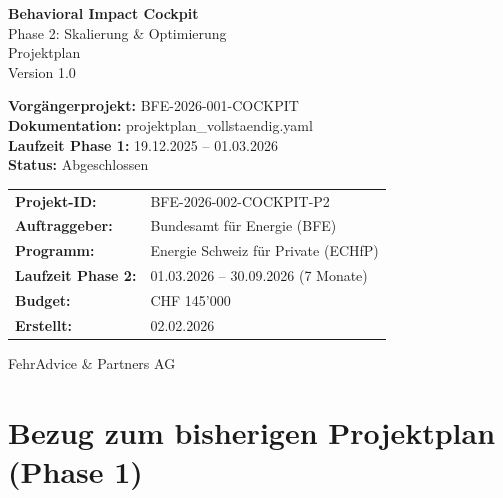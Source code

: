 \documentclass[11pt,a4paper]{article}
\begin{document}
\begin{titlepage}
    \centering
    \vspace*{2cm}

    {\Huge\bfseries\textcolor{fadarkblue}{Behavioral Impact Cockpit}}\\[0.5cm]
    {\LARGE\textcolor{fadarkblue}{Phase 2: Skalierung \& Optimierung}}\\[2cm]

    {\Large Projektplan}\\[0.5cm]
    {\large Version 1.0}\\[3cm]

    \begin{tcolorbox}[referenzbox={Bezug zu Phase 1}]
        \textbf{Vorgängerprojekt:} BFE-2026-001-COCKPIT\\
        \textbf{Dokumentation:} projektplan\_vollstaendig.yaml\\
        \textbf{Laufzeit Phase 1:} 19.12.2025 -- 01.03.2026\\
        \textbf{Status:} Abgeschlossen
    \end{tcolorbox}

    \vfill

    \begin{tabular}{ll}
        \textbf{Projekt-ID:} & BFE-2026-002-COCKPIT-P2\\
        \textbf{Auftraggeber:} & Bundesamt für Energie (BFE)\\
        \textbf{Programm:} & Energie Schweiz für Private (ECHfP)\\
        \textbf{Laufzeit Phase 2:} & 01.03.2026 -- 30.09.2026 (7 Monate)\\
        \textbf{Budget:} & CHF 145'000\\
        \textbf{Erstellt:} & 02.02.2026\\
    \end{tabular}

    \vspace{1cm}
    {\small\textcolor{fadarkgray}{FehrAdvice \& Partners AG}}
\end{titlepage}

\tableofcontents
\newpage

\section{Bezug zum bisherigen Projektplan (Phase 1)}
\end{document}

